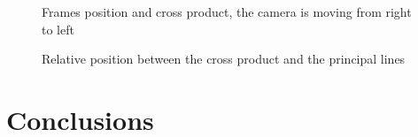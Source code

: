   \begin{figure}[!h]
  \centering
     
      \caption{Frames position and cross product, the camera is moving from right to left}
      \label{fig:lateralFRames}
   \end{figure}

    
  \begin{figure}[!h]
  \centering
      
      \caption{Relative position between the cross product and the principal lines }
    \label{fig:LateralPosition}
  \end{figure}

  \color{black}
%

\section{Conclusions}
